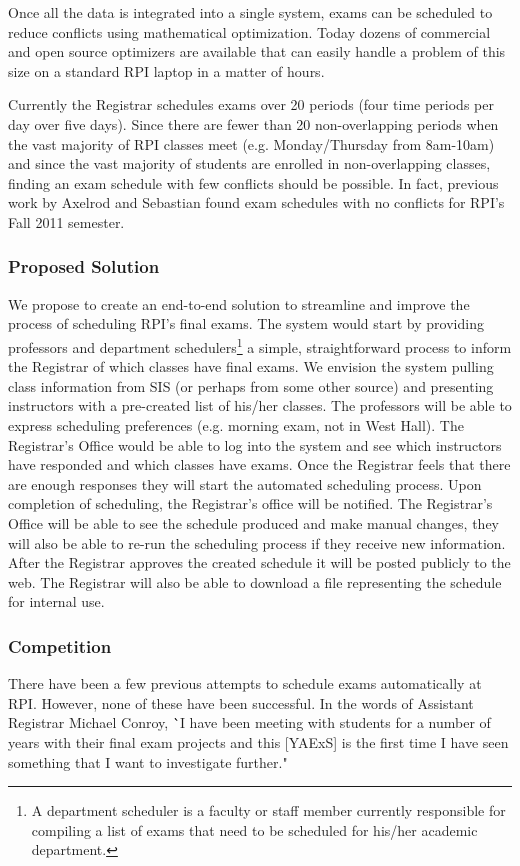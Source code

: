 \documentclass[11pt]{article}
\begin{document}
Once all the data is integrated into a single system, exams can be scheduled to reduce conflicts using mathematical optimization. Today dozens of commercial and open source optimizers are available that can easily handle a problem of this size on a standard RPI laptop in a matter of hours.

Currently the Registrar schedules exams over 20 periods (four time periods per day over five days).  Since there are fewer than 20 non-overlapping periods when the vast majority of RPI classes meet (e.g. Monday/Thursday from 8am-10am) and since the vast majority of students are enrolled in non-overlapping classes, finding an exam schedule with few conflicts should be possible.  In fact, previous work by Axelrod and Sebastian found exam schedules with no conflicts for RPI's Fall 2011 semester.

\subsubsection*{Proposed Solution}

We propose to create an end-to-end solution to streamline and improve the process of scheduling RPI's final exams.  The system would start by providing professors and department schedulers\footnote{A department scheduler is a faculty or staff member currently responsible for compiling a list of exams that need to be scheduled for his/her academic department.} a simple, straightforward process to inform the Registrar of which classes have final exams.  We envision the system pulling class information from SIS (or perhaps from some other source) and presenting instructors with a pre-created list of his/her classes.  The professors will be able to express scheduling preferences (e.g. morning exam, not in West Hall).  The Registrar's Office would be able to log into the system and see which instructors have responded and which classes have exams.  Once the Registrar feels that there are enough responses they will start the automated scheduling process.  Upon completion of scheduling, the Registrar's office will be notified.  The Registrar's Office will be able to see the schedule produced and make manual changes, they will also be able to re-run the scheduling process if they receive new information.  After the Registrar approves the created schedule it will be posted publicly to the web.  The Registrar will also be able to download a  file representing the schedule for internal use.

\subsubsection*{Competition}
There have been a few previous attempts to schedule exams automatically at RPI. However, none of these have been successful.  In the words of Assistant Registrar Michael Conroy,  \``I have been meeting with students for a number of years with their final exam projects and this [YAExS] is the first time I have seen something that I want to investigate further."
\end{document}
